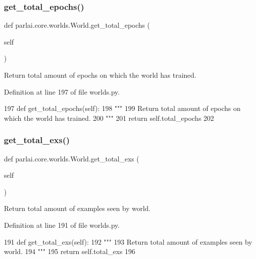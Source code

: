 \subsubsection{\texorpdfstring{get\+\_\+total\+\_\+epochs()}{get\_total\_epochs()}}
{\footnotesize\ttfamily def parlai.\+core.\+worlds.\+World.\+get\+\_\+total\+\_\+epochs (\begin{DoxyParamCaption}\item[{}]{self }\end{DoxyParamCaption})}

\begin{DoxyVerb}Return total amount of epochs on which the world has trained.
\end{DoxyVerb}
 

Definition at line 197 of file worlds.\+py.


\begin{DoxyCode}
197     \textcolor{keyword}{def }get\_total\_epochs(self):
198         \textcolor{stringliteral}{"""}
199 \textcolor{stringliteral}{        Return total amount of epochs on which the world has trained.}
200 \textcolor{stringliteral}{        """}
201         \textcolor{keywordflow}{return} self.total\_epochs
202 
\end{DoxyCode}
\mbox{\label{classparlai_1_1core_1_1worlds_1_1World_a0f9926a92069bfb833a6c4a531d99b70}} 
\subsubsection{\texorpdfstring{get\+\_\+total\+\_\+exs()}{get\_total\_exs()}}
{\footnotesize\ttfamily def parlai.\+core.\+worlds.\+World.\+get\+\_\+total\+\_\+exs (\begin{DoxyParamCaption}\item[{}]{self }\end{DoxyParamCaption})}

\begin{DoxyVerb}Return total amount of examples seen by world.
\end{DoxyVerb}
 

Definition at line 191 of file worlds.\+py.


\begin{DoxyCode}
191     \textcolor{keyword}{def }get\_total\_exs(self):
192         \textcolor{stringliteral}{"""}
193 \textcolor{stringliteral}{        Return total amount of examples seen by world.}
194 \textcolor{stringliteral}{        """}
195         \textcolor{keywordflow}{return} self.total\_exs
196 
\end{DoxyCode}
\mbox{\label{classparlai_1_1core_1_1worlds_1_1World_a5ef8bd0bc50edb86ef87e4a3e72b6192}} 
